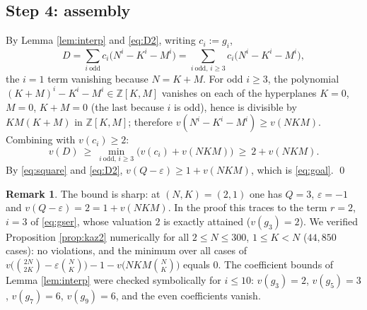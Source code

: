 \documentclass[11pt]{amsart}
\theoremstyle{definition}
\newtheorem{remark}[theorem]{Remark}
\newcommand{\ZZ}{\mathbb{Z}}
\begin{document}
\subsection*{Step 4: assembly}
By Lemma \ref{lem:interp} and \eqref{eq:D2}, writing $c_i:=g_i$,
\[
D=\sum_{i\ \mathrm{odd}}c_i\big(N^i-K^i-M^i\big)
=\sum_{i\ \mathrm{odd},\,i\ge3}c_i\big(N^i-K^i-M^i\big),
\]
the $i=1$ term vanishing because $N=K+M$. For odd $i\ge3$, the polynomial $(K+M)^i-K^i-M^i\in\ZZ[K,M]$ vanishes on each of the hyperplanes $K=0$, $M=0$, $K+M=0$ (the last because $i$ is odd), hence is divisible by $KM(K+M)$ in $\ZZ[K,M]$; therefore $v(N^i-K^i-M^i)\ge v(NKM)$. Combining with $v(c_i)\ge2$:
\[
v(D)\ \ge\ \min_{i\ \mathrm{odd},\, i\ge3}\big(v(c_i)+v(NKM)\big)\ \ge\ 2+v(NKM).
\]
By \eqref{eq:square} and \eqref{eq:D2}, $v(Q-\varepsilon)\ge1+v(NKM)$, which is \eqref{eq:goal}. \qed

\begin{remark}
The bound is sharp: at $(N,K)=(2,1)$ one has $Q=3$, $\varepsilon=-1$ and $v(Q-\varepsilon)=2=1+v(NKM)$. In the proof this traces to the term $r=2$, $i=3$ of \eqref{eq:gser}, whose valuation $2$ is exactly attained ($v(g_3)=2$). We verified Proposition \ref{prop:kaz2} numerically for all $2\le N\le300$, $1\le K<N$ ($44{,}850$ cases): no violations, and the minimum over all cases of $v\big(\binom{2N}{2K}-\varepsilon\binom NK\big)-1-v\big(NKM\binom NK\big)$ equals $0$. The coefficient bounds of Lemma \ref{lem:interp} were checked symbolically for $i\le10$: $v(g_3)=2$, $v(g_5)=3$, $v(g_7)=6$, $v(g_9)=6$, and the even coefficients vanish.
\end{remark}
\end{document}
